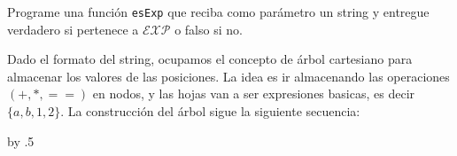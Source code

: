 \documentclass[letterpaper,10pt,table, dvipsnames]{article}
\begin{document}
\newpage

\begin{tcolorbox}
 Programe una función \texttt{esExp} que reciba como parámetro un string y entregue verdadero si pertenece a $\mathcal{EXP}$ o falso si no.
\end{tcolorbox}

Dado el formato del string, ocupamos el concepto de árbol cartesiano para almacenar los valores de las posiciones. La idea es ir almacenando las operaciones $(+,*, ==)$ en nodos, y las hojas van a ser expresiones basicas, es decir $\{a,b,1,2\}$. La construcción del árbol sigue la siguiente secuencia:

\newdimen\arrowsize
{}
{
\arrowsize=0.2pt
\advance\arrowsize by .5\pgflinewidth
\pgfsetdash{}{0pt} %
\pgfsetroundjoin %
\pgfsetroundcap %
\pgfpathmoveto{\pgfpoint{-4\arrowsize}{4\arrowsize}}
\pgfusepathqstroke
}
\end{document}
